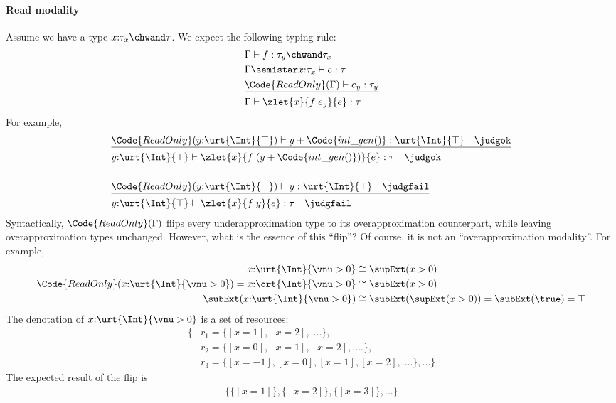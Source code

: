 \paragraph{Read modality} Assume we have a type $x{:}\tau_x \chwand \tau$. We expect the following typing rule:
\begin{align*}
&\Gamma \vdash f : \tau_y \chwand \tau_x
 \\&\Gamma \semistar x{:}\tau_x \vdash e : \tau
 \\&\underline{\Code{ReadOnly}(\Gamma) \vdash e_y : \tau_y}
  \\&\Gamma \vdash \zlet{x}{f\;e_y}{e} : \tau
\end{align*}\noindent
For example,
\begin{align*}
  &\underline{\Code{ReadOnly}(y{:}\urt{\Int}{\top}) \vdash y + \Code{int\_gen()} : \urt{\Int}{\top} \quad \judgok}
  \\&y{:}\urt{\Int}{\top} \vdash \zlet{x}{f\;(y + \Code{int\_gen()})}{e} : \tau \quad \judgok
  \\[0.5cm]
  &\underline{\Code{ReadOnly}(y{:}\urt{\Int}{\top}) \vdash y : \urt{\Int}{\top} \quad \judgfail}
  \\&y{:}\urt{\Int}{\top} \vdash \zlet{x}{f\;y}{e} : \tau \quad \judgfail
\end{align*}\noindent
Syntactically, $\Code{ReadOnly}(\Gamma)$ flips every underapproximation type to its overapproximation counterpart, while leaving overapproximation types unchanged. However, what is the essence of this ``flip''? Of course, it is not an ``overapproximation modality''. For example,
\begin{align*}
  x{:}\urt{\Int}{\vnu > 0} &\cong \supExt (x > 0) \\
  \Code{ReadOnly}(x{:}\urt{\Int}{\vnu > 0}) = x{:}\ort{\Int}{\vnu > 0} &\cong \subExt (x > 0) \\
  \subExt (x{:}\urt{\Int}{\vnu > 0}) &\cong \subExt (\supExt (x > 0)) = \subExt (\true) = \top
\end{align*}\noindent
The denotation of $x{:}\urt{\Int}{\vnu > 0}$ is a set of resources:
\begin{align*}
  \{&r_1 = \{[x = 1], [x = 2], ....\},\\
    &r_2 = \{[x = 0], [x = 1], [x = 2], ....\},\\
    &r_3 = \{[x = -1], [x = 0], [x = 1], [x = 2], ....\}, ... \}
\end{align*}\noindent
The expected result of the flip is
\begin{align*}
  \{\{[x = 1]\}, \{[x = 2]\}, \{[x = 3]\}, ... \}
\end{align*}\noindent
